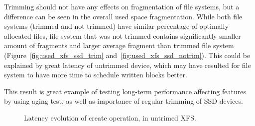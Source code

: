 \documentclass[
  color, %
  table, %
  lof,   %
  lot,   %
]{fithesis3}
\begin{document}
Trimming should not have any effects on fragmentation of file systems, but a difference can be seen in the overall used space fragmentation. While both file systems (trimmed and not trimmed) have similar percentage of optimally allocated files, file system that was not trimmed contains significantly smaller amount of fragments and larger average fragment than trimmed file system (Figure~\ref{fig:used_xfs_ssd_trim} and~\ref{fig:used_xfs_ssd_notrim}). This could be explained by great latency of untrimmed device, which may have resulted for file system to have more time to schedule written blocks better.

This result is great example of testing long-term performance affecting features by using aging test, as well as importance of regular trimming of SSD devices.


\begin{figure}
    \centering
    \caption[Evolution of latency of create operation, in untrimed file system (XFS)]{Latency evolution of create operation, in untrimed XFS.}
    \label{fig:notrim_create}
\end{figure}
\end{document}

